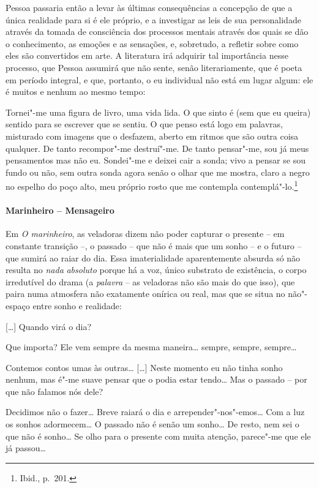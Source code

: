 Pessoa passaria então a levar às últimas consequências a concepção de
que a única realidade para si é ele próprio, e a investigar as leis de
sua personalidade através da tomada de consciência dos processos
mentais através dos quais se dão o conhecimento, as emoções e as
sensações, e, sobretudo, a refletir sobre como eles são convertidos em
arte. A literatura irá adquirir tal importância nesse processo, que
Pessoa assumirá que não sente, senão literariamente, que é poeta em
período integral, e que, portanto, o eu individual não está em lugar
algum: ele é muitos e nenhum ao mesmo tempo: 

\begin{hedraquote}
Tornei"-me uma figura de livro, uma vida lida. O que sinto é (sem que eu
queira) sentido para se escrever que se sentiu. O que penso está logo
em palavras, misturado com imagens que o desfazem, aberto em ritmos que
são outra coisa qualquer. De tanto recompor"-me destruí"-me. De tanto
pensar"-me, sou já meus pensamentos mas não eu. Sondei"-me e deixei cair
a sonda; vivo a pensar se sou fundo ou não, sem outra sonda agora senão
o olhar que me mostra, claro a negro no espelho do poço alto, meu
próprio rosto que me contempla contemplá"-lo.\footnote{ Ibid., p.~201.} 
\end{hedraquote}



\paragraph{Marinheiro -- Mensageiro}

Em \textit{O marinheiro}, as veladoras dizem não poder capturar o
presente -- em constante transição --,
o passado -- que não é mais que um
sonho -- e o futuro -- que sumirá ao 
raiar do dia. Essa imaterialidade
aparentemente absurda só não resulta 
no \textit{nada} \textit{absoluto}
porque há a voz, único substrato de 
existência, o corpo irredutível do
drama (a \textit{palavra} -- as veladoras 
não são mais do que isso), que
paira numa atmosfera não exatamente onírica 
ou real, mas que se situa
no não"-espaço entre sonho e realidade:

\begin{hedraquote}
 [\ldots{}] Quando virá o dia?

 Que importa? Ele vem sempre
da mesma maneira\ldots{} sempre,
sempre, sempre\ldots{}

\hfill{}

 Contemos contos umas às
outras\ldots{} [\ldots{}] Neste momento eu não
tinha sonho nenhum, mas é"-me suave pensar
que o podia estar tendo\ldots{}
Mas o passado -- por que não falamos nós dele? 

 Decidimos não o fazer\ldots{} Breve raiará o dia e
arrepender"-nos"-emos\ldots{} Com a luz os sonhos adormecem\ldots{}
O passado não é
senão um sonho\ldots{} De resto, nem sei
o que não é sonho\ldots{} Se olho para o
presente com muita atenção, parece"-me que ele já passou\ldots{}
\end{hedraquote}


